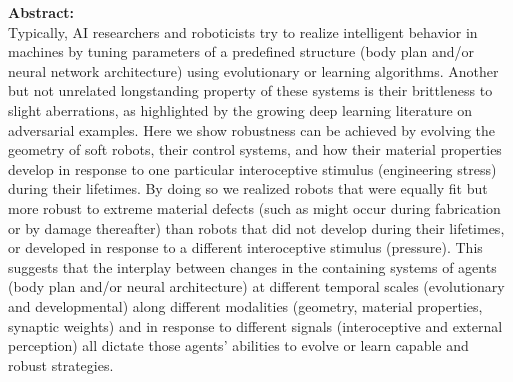 \noindent
\textbf{Abstract:}\\
\noindent
Typically, AI researchers and roboticists try to realize
intelligent behavior in machines by tuning parameters of a 
predefined structure (body plan and/or neural network
architecture) using evolutionary or learning algorithms. 
Another but not unrelated longstanding property of these systems is their brittleness to slight aberrations, as highlighted by the growing deep learning literature on adversarial examples.
Here we show robustness can be achieved by
evolving the 
geometry of soft robots, their
control systems, and how
their material properties develop
in response to one particular interoceptive stimulus
(engineering stress) during their lifetimes.
By doing so we realized robots that 
were equally fit but more robust to 
extreme material defects (such as 
might occur during fabrication or by damage thereafter)
than robots that did not develop during their lifetimes,
or developed in response to a different interoceptive
stimulus (pressure).
This suggests that the interplay between changes
in the containing systems
of agents (body plan and/or neural architecture)
at different temporal scales (evolutionary
and developmental) along different modalities
(geometry, material properties, synaptic weights)
and in response to different signals (interoceptive
and external perception) all
dictate those agents' abilities to evolve or 
learn capable and robust strategies. 
















